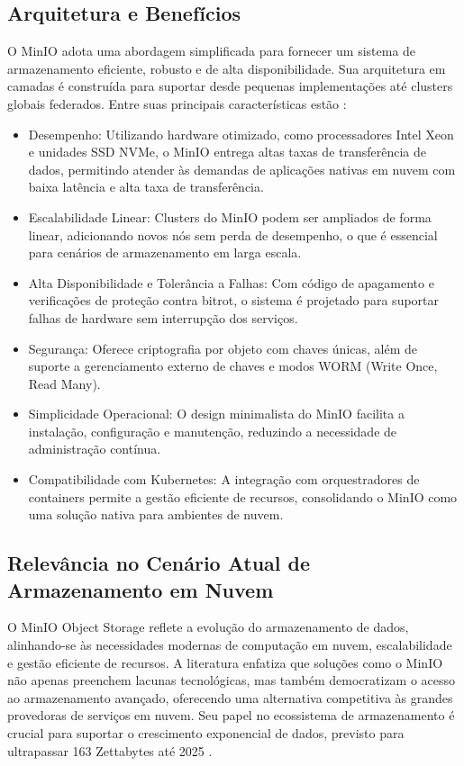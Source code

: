 \subsection{Arquitetura e Benefícios}
O MinIO adota uma abordagem simplificada para fornecer um sistema de armazenamento eficiente, robusto e de alta disponibilidade. Sua arquitetura em camadas é construída para suportar desde pequenas implementações até clusters globais federados. Entre suas principais características estão \cite{minio_reference_architecture}:
\begin{itemize}
    \item Desempenho: Utilizando hardware otimizado, como processadores Intel Xeon e unidades SSD NVMe, o MinIO entrega altas taxas de transferência de dados, permitindo atender às demandas de aplicações nativas em nuvem com baixa latência e alta taxa de transferência.
    \item Escalabilidade Linear: Clusters do MinIO podem ser ampliados de forma linear, adicionando novos nós sem perda de desempenho, o que é essencial para cenários de armazenamento em larga escala.
    \item Alta Disponibilidade e Tolerância a Falhas: Com código de apagamento e verificações de proteção contra bitrot, o sistema é projetado para suportar falhas de hardware sem interrupção dos serviços.
    \item Segurança: Oferece criptografia por objeto com chaves únicas, além de suporte a gerenciamento externo de chaves e modos WORM (Write Once, Read Many).
    \item Simplicidade Operacional: O design minimalista do MinIO facilita a instalação, configuração e manutenção, reduzindo a necessidade de administração contínua.
    \item Compatibilidade com Kubernetes: A integração com orquestradores de containers permite a gestão eficiente de recursos, consolidando o MinIO como uma solução nativa para ambientes de nuvem.
\end{itemize}

\subsection{Relevância no Cenário Atual de Armazenamento em Nuvem}
O MinIO Object Storage reflete a evolução do armazenamento de dados, alinhando-se às necessidades modernas de computação em nuvem, 
escalabilidade e gestão eficiente de recursos. A literatura enfatiza que soluções como o MinIO não apenas preenchem lacunas tecnológicas, 
mas também democratizam o acesso ao armazenamento avançado, oferecendo uma alternativa competitiva às grandes provedoras de serviços 
em nuvem. Seu papel no ecossistema de armazenamento é crucial para suportar o crescimento exponencial de dados, previsto para 
ultrapassar 163 Zettabytes até 2025 \cite{minio_reference_architecture}.

